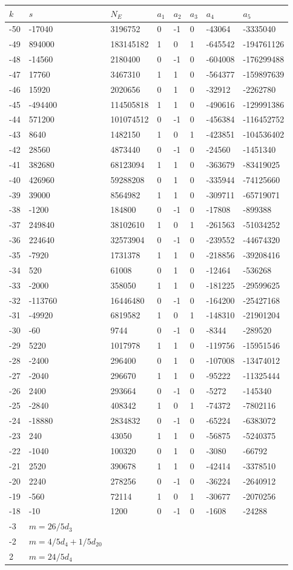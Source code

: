 \documentclass{amsart}
\begin{document}
\begin{longtable}{|l|l|l|lllll|}
\hline
$k$ & $s$ & $N_E$ & $a_1$ & $a_2$ & $a_3$ & $a_4$ & $a_5$\\
\hline
-50&-17040&3196752&0&-1&0&-43064&-3335040\\
-49&894000&183145182&1&0&1&-645542&-194761126\\
-48&-14560&2180400&0&-1&0&-604008&-176299488\\
-47&17760&3467310&1&1&0&-564377&-159897639\\
-46&15920&2020656&0&1&0&-32912&-2262780\\
-45&-494400&114505818&1&1&0&-490616&-129991386\\
-44&571200&101074512&0&-1&0&-456384&-116452752\\
-43&8640&1482150&1&0&1&-423851&-104536402\\
-42&28560&4873440&0&-1&0&-24560&-1451340\\
-41&382680&68123094&1&1&0&-363679&-83419025\\
-40&426960&59288208&0&1&0&-335944&-74125660\\
-39&39000&8564982&1&1&0&-309711&-65719071\\
-38&-1200&184800&0&-1&0&-17808&-899388\\
-37&249840&38102610&1&0&1&-261563&-51034252\\
-36&224640&32573904&0&-1&0&-239552&-44674320\\
-35&-7920&1731378&1&1&0&-218856&-39208416\\
-34&520&61008&0&1&0&-12464&-536268\\
-33&-2000&358050&1&1&0&-181225&-29599625\\
-32&-113760&16446480&0&-1&0&-164200&-25427168\\
-31&-49920&6819582&1&0&1&-148310&-21901204\\
-30&-60&9744&0&-1&0&-8344&-289520\\
-29&5220&1017978&1&1&0&-119756&-15951546\\
-28&-2400&296400&0&1&0&-107008&-13474012\\
-27&-2040&296670&1&1&0&-95222&-11325444\\
-26&2400&293664&0&-1&0&-5272&-145340\\
-25&-2840&408342&1&0&1&-74372&-7802116\\
-24&-18880&2834832&0&-1&0&-65224&-6383072\\
-23&240&43050&1&1&0&-56875&-5240375\\
-22&-1040&100320&0&1&0&-3080&-66792\\
-21&2520&390678&1&1&0&-42414&-3378510\\
-20&2240&278256&0&-1&0&-36224&-2640912\\
-19&-560&72114&1&0&1&-30677&-2070256\\
-18&-10&1200&0&-1&0&-1608&-24288\\
-3&$m=26/5d_{3}$&&\multicolumn{5}{c|}{}\\
-2&$m=4/5d_{4}+1/5d_{20}$&&\multicolumn{5}{c|}{}\\
2&$m=24/5d_{4}$&&\multicolumn{5}{c|}{}\\
\hline
\end{longtable}
\end{document}

